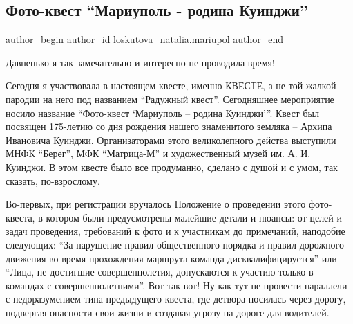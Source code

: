  
 
 
 
 

\subsection{Фото-квест \enquote{Мариуполь - родина Куинджи}}
\label{sec:30_07_2016.fb.loskutova_natalia.mariupol.1.fotokvest_rodina_kuindzhi}

\ifcmt
 author_begin
   author_id loskutova_natalia.mariupol
 author_end
\fi

Давненько я так замечательно и интересно не проводила время! 


Сегодня я участвовала в настоящем квесте, именно КВЕСТЕ, а не той жалкой
пародии на него под названием \enquote{Радужный квест}. Сегодняшнее мероприятие носило
название \enquote{Фото-квест \enquote{Мариуполь – родина Куинджи}}. Квест был посвящен
175-летию со дня рождения нашего знаменитого земляка – Архипа Ивановича
Куинджи. Организаторами этого великолепного действа выступили МНФК \enquote{Берег}, МФК
\enquote{Матрица-М} и художественный музей им. А. И. Куинджи. В этом квесте было все
продуманно, сделано с душой и с умом, так сказать, по-взрослому. 

Во-первых, при регистрации вручалось Положение о проведении этого фото-квеста,
в котором были предусмотрены малейшие детали и нюансы: от целей и задач
проведения, требований к фото и к участникам до примечаний, наподобие
следующих: \enquote{За нарушение правил общественного порядка и правил дорожного
движения во время прохождения маршрута команда дисквалифицируется} или \enquote{Лица,
не достигшие совершеннолетия, допускаются к участию только в командах с
совершеннолетними}. Вот так вот! Ну как тут не провести параллели с
недоразумением типа предыдущего квеста, где детвора носилась через дорогу,
подвергая опасности свои жизни и создавая угрозу на дороге для водителей. 

